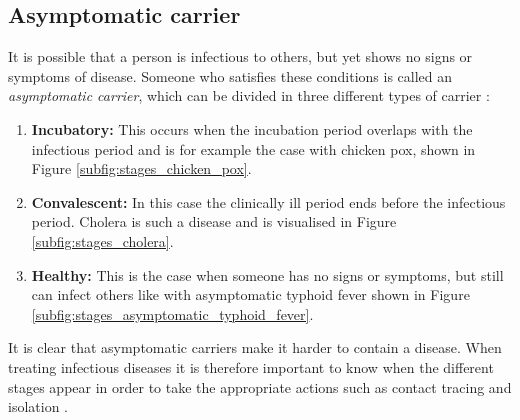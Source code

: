 \subsection{Asymptomatic carrier}
\label{subsec:asymptomatic_carrier}
It is possible that a person is infectious to others, but yet shows no signs or symptoms of disease. Someone who satisfies these conditions is called an \textit{asymptomatic carrier}, which can be divided in three different types of carrier \cite{book:principles_infectious_diseases}:
\begin{enumerate}
    \item \textbf{Incubatory:} This occurs when the incubation period overlaps with the infectious period and is for example the case with chicken pox, shown in Figure \ref{subfig:stages_chicken_pox}.
    \item \textbf{Convalescent:} In this case the clinically ill period ends before the infectious period. Cholera is such a disease and is visualised in Figure \ref{subfig:stages_cholera}.
    \item \textbf{Healthy:} This is the case when someone has no signs or symptoms, but still can infect others like with asymptomatic typhoid fever shown in Figure \ref{subfig:stages_asymptomatic_typhoid_fever}.
\end{enumerate}
It is clear that asymptomatic carriers make it harder to contain a disease. When treating infectious diseases it is therefore important to know when the different stages appear in order to take the appropriate actions such as contact tracing and isolation \cite{contact_tracing_and_disease_control}.

